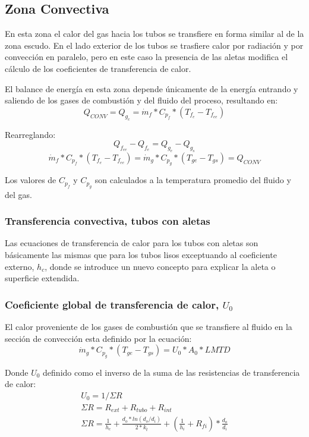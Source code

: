 \subsection{Zona Convectiva}
\par En esta zona el calor del gas hacia los tubos se transfiere en forma similar al de la zona escudo. En el lado exterior de los tubos se trasfiere calor por radiación y por convección en paralelo, pero en este caso la presencia de las aletas modifica el cálculo de los coeficientes de transferencia de calor.
\par El balance de energía en esta zona depende únicamente de la energía entrando y saliendo de los gases de combustión y del fluido del proceso, resultando en:
\begin{equation}
\label{eq:conv}
Q_{CONV} = Q_{g_c} = \dot m_{f} *C_{p_f} *(T_{f_e} - T_{f_{ee}})
\end{equation}
\par Rearreglando:
\begin{equation}
Q_{f_{ee}} - Q_{f_e} = Q_{g_e} - Q_{g_s}
\end{equation} \begin{equation} \label{eq:qconv}
\dot m_{f} *C_{p_f} *(T_{f_e} - T_{f_{ee}}) = 
\dot m_{g} *C_{p_g} *(T_{ge}  - T_{gs}) = Q_{CONV}
\end{equation}
\par Los valores de $C_{p_f}$ y $C_{p_g}$ son calculados a la temperatura promedio del fluido y del gas.

\subsubsection{Transferencia convectiva, tubos con aletas}
\par Las ecuaciones de transferencia de calor para los tubos con aletas son básicamente las mismas que para los tubos lisos exceptuando al coeficiente externo, $h_c$, donde se introduce un nuevo concepto para explicar la aleta o superficie extendida.

\subsubsection{Coeficiente global de transferencia de calor, $U_0$}
\par El calor proveniente de los gases de combustión que se transfiere al fluido en la sección de convección esta definido por la ecuación:
\begin{equation}
\dot m_{g} *C_{p_g} *(T_{ge}  - T_{gs}) = U_0 *A_0 *LMTD
\end{equation}
\par Donde $U_0$ definido como el inverso de la suma de las resistencias de transferencia de calor:
\begin{gather}
\label{}
U_0  = 1 / \Sigma R \\
\Sigma R = R_{ext} + R_{tubo} + R_{int} \\
\Sigma R =  \frac{1}{h_{c}} 
            +\frac{d_o*ln(d_o/d_i)}{2*k_t} 
            +(\frac{1}{h_i}+R_{fi})*\frac{d_o}{d_i} 
\end{gather}

